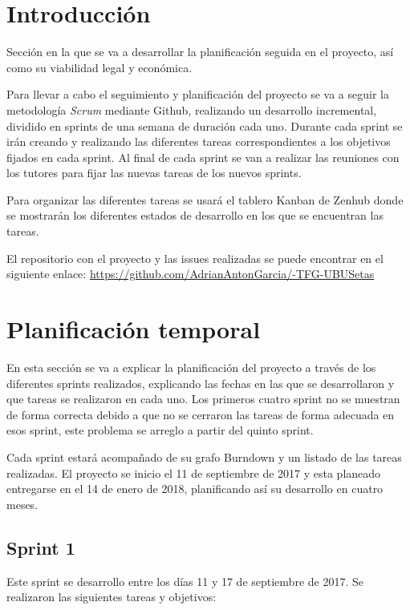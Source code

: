 
\section{Introducción}

Sección en la que se va a desarrollar la planificación seguida en el proyecto, así como su viabilidad legal y económica.

Para llevar a cabo el seguimiento y planificación del proyecto se va a seguir la metodología \textit{Scrum} mediante Github, realizando un desarrollo incremental, dividido en sprints de una semana de duración cada uno. Durante cada sprint se irán creando y realizando las diferentes tareas correspondientes a los objetivos fijados en cada sprint. Al final de cada sprint se van a realizar las reuniones con los tutores para fijar las nuevas tareas de los nuevos sprints.

Para organizar las diferentes tareas se usará el tablero Kanban de Zenhub donde se mostrarán los diferentes estados de desarrollo en los que se encuentran las tareas.

El repositorio con el proyecto y las issues realizadas se puede encontrar en el siguiente enlace:
\url{https://github.com/AdrianAntonGarcia/-TFG-UBUSetas}

\section{Planificación temporal}

En esta sección se va a explicar la planificación del proyecto a través de los diferentes sprints realizados, explicando las fechas en las que se desarrollaron y que tareas se realizaron en cada uno. Los primeros cuatro sprint no se muestran de forma correcta debido a que no se cerraron las tareas de forma adecuada en esos sprint, este problema se arreglo a partir del quinto sprint.

Cada sprint estará acompañado de su grafo Burndown y un listado de las tareas realizadas. El proyecto se inicio el 11 de septiembre de 2017 y esta planeado entregarse en el 14 de enero de 2018, planificando así su desarrollo en cuatro meses.

\subsection{Sprint 1}

Este sprint se desarrollo entre los días 11 y 17 de septiembre de 2017. Se realizaron las siguientes tareas y objetivos:

